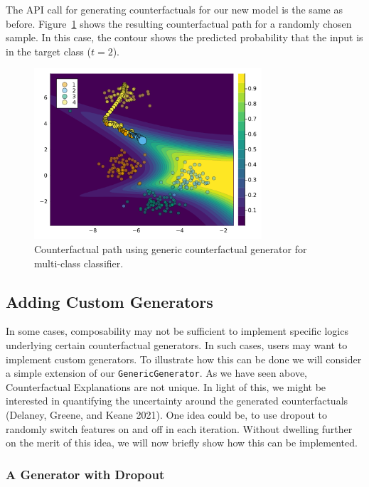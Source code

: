 \documentclass{juliacon}
\begin{document}
The API call for generating counterfactuals for our new model is the
same as before. Figure~\ref{fig-multi} shows the resulting
counterfactual path for a randomly chosen sample. In this case, the
contour shows the predicted probability that the input is in the target
class (\(t=2\)).

\begin{figure}

{\centering \includegraphics[width=3.33333in,height=2.5in]{www/ce_multi.png}

}

\caption{\label{fig-multi}Counterfactual path using generic
counterfactual generator for multi-class classifier.}

\end{figure}

\hypertarget{sec-custom-gen}{%
\subsection{Adding Custom Generators}\label{sec-custom-gen}}

In some cases, composability may not be sufficient to implement specific
logics underlying certain counterfactual generators. In such cases,
users may want to implement custom generators. To illustrate how this
can be done we will consider a simple extension of our
\texttt{GenericGenerator}. As we have seen above, Counterfactual
Explanations are not unique. In light of this, we might be interested in
quantifying the uncertainty around the generated counterfactuals
(Delaney, Greene, and Keane 2021). One idea could be, to use dropout to
randomly switch features on and off in each iteration. Without dwelling
further on the merit of this idea, we will now briefly show how this can
be implemented.

\hypertarget{a-generator-with-dropout}{%
\subsubsection{A Generator with
Dropout}\label{a-generator-with-dropout}}
\end{document}
